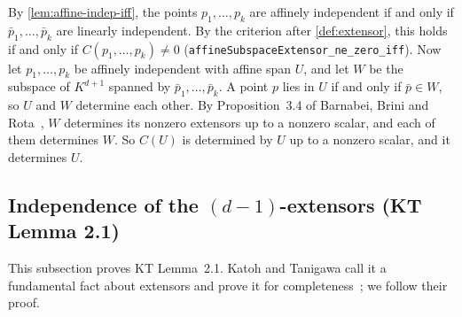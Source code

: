 By \cref{lem:affine-indep-iff}, the points $p_1, \dots, p_k$ are
affinely independent if and only if $\bar p_1, \dots, \bar p_k$ are
linearly independent. By the criterion after \cref{def:extensor}, this
holds if and only if $C(p_1, \dots, p_k) \neq 0$
(\texttt{affineSubspaceExtensor\_\allowbreak{}ne\_\allowbreak{}zero\_\allowbreak{}iff}).
Now let $p_1, \dots, p_k$ be affinely independent with affine span $U$,
and let $W$ be the subspace of $K^{d+1}$ spanned by
$\bar p_1, \dots, \bar p_k$. A point $p$ lies in $U$ if and only if
$\bar p \in W$, so $U$ and $W$ determine each other. By Proposition~3.4
of Barnabei, Brini and Rota~\cite{barnabeiBriniRota1985}, $W$
determines its nonzero extensors up to a nonzero scalar, and each of
them determines $W$. So $C(U)$ is determined by $U$ up to a nonzero
scalar, and it determines $U$.

\subsection{Independence of the $(d-1)$-extensors (KT Lemma 2.1)}
\label{sec:molecular-lemma21}

This subsection proves KT Lemma~2.1. Katoh and Tanigawa call it a
fundamental fact about extensors and prove it for
completeness~\cite[pp.~651--652]{katohTanigawa2011}; we follow their
proof.

